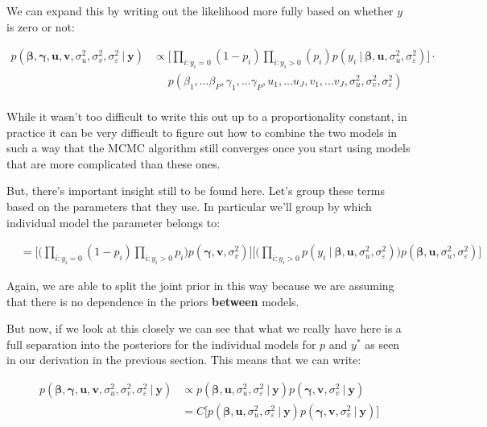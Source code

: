 \documentclass[12pt,twoside]{reedthesis}
\begin{document}
We can expand this by writing out the likelihood more fully based on whether \(y\) is zero or not:

\[
\begin{aligned}
p(\boldsymbol{\beta}, \boldsymbol{\gamma}, \mathbf{u}, \mathbf{v}, \sigma_u^2, \sigma_v^2, \sigma_{\varepsilon}^2 \ | \ \mathbf{y}) & \propto \bigg[\prod_{i:y_i = 0}(1-p_i)\prod_{i:y_i > 0}(p_i)p(y_i \ | \ \boldsymbol{\beta}, \mathbf{u}, \sigma_u^2, \sigma_{\varepsilon}^2)\bigg]\cdot \\
& \ \ \ \ \ \  p(\beta_1, ... \beta_P, \gamma_1,...\gamma_P, u_1, ... u_J, v_1, ... v_J, \sigma_u^2, \sigma_v^2, \sigma_{\varepsilon}^2)\\
\end{aligned}
\]

While it wasn't too difficult to write this out up to a proportionality constant, in practice it can be very difficult to figure out how to combine the two models in such a way that the MCMC algorithm still converges once you start using models that are more complicated than these ones.

But, there's important insight still to be found here. Let's group these terms based on the parameters that they use. In particular we'll group by which individual model the parameter belongs to:

\[
\begin{aligned}
&= \Bigg[\Big(\prod_{i:y_i = 0}(1- p_i)\prod_{i: y_i > 0}p_i\Big)p(\boldsymbol{\gamma}, \mathbf{v}, \sigma_v^2)\Bigg]\Bigg[\Big(\prod_{i:y_i > 0}p(y_i \ | \ \boldsymbol{\beta}, \mathbf{u}, \sigma_u^2, \sigma_{\varepsilon}^2)\Big)p(\boldsymbol{\beta},\mathbf{u}, \sigma_u^2, \sigma_{\varepsilon}^2)\Bigg]
\end{aligned}
\]

Again, we are able to split the joint prior in this way because we are assuming that there is no dependence in the priors \textbf{between} models.

But now, if we look at this closely we can see that what we really have here is a full separation into the posteriors for the individual models for \(p\) and \(y^*\) as seen in our derivation in the previous section. This means that we can write:

\[
\begin{aligned}
p(\boldsymbol{\beta}, \boldsymbol{\gamma}, \mathbf{u}, \mathbf{v}, \sigma_u^2, \sigma_v^2, \sigma_{\varepsilon}^2\ | \ \mathbf{y})  &\propto p(\boldsymbol{\beta}, \mathbf{u}, \sigma_u^2, \sigma_{\varepsilon}^2 \ | \ \mathbf{y})p(\boldsymbol{\gamma}, \mathbf{v}, \sigma_v^2 \ | \ \mathbf{y}) \\
  &= C\bigg[p(\boldsymbol{\beta}, \mathbf{u}, \sigma_u^2, \sigma_{\varepsilon}^2 \ | \ \mathbf{y})p(\boldsymbol{\gamma}, \mathbf{v}, \sigma_v^2 \ | \ \mathbf{y})\bigg]
\end{aligned}
\]
\end{document}
